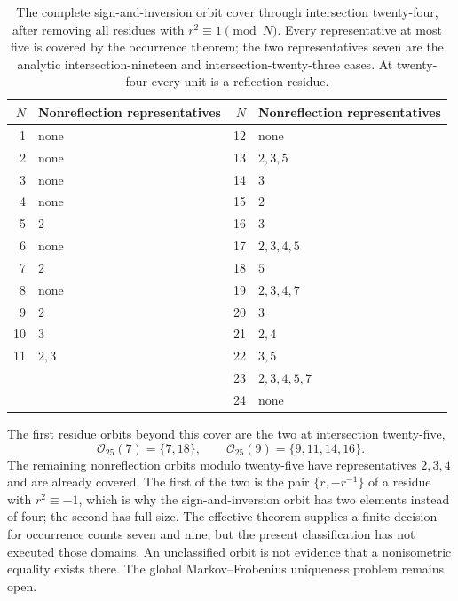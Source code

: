 \begin{table}[htbp]
\centering
\begin{tabular}{@{}rl@{\qquad}rl@{}}
\toprule
$N$ & Nonreflection representatives & $N$ & Nonreflection representatives\\
\midrule
1 & none & 12 & none\\
2 & none & 13 & $2,3,5$\\
3 & none & 14 & $3$\\
4 & none & 15 & $2$\\
5 & $2$ & 16 & $3$\\
6 & none & 17 & $2,3,4,5$\\
7 & $2$ & 18 & $5$\\
8 & none & 19 & $2,3,4,7$\\
9 & $2$ & 20 & $3$\\
10 & $3$ & 21 & $2,4$\\
11 & $2,3$ & 22 & $3,5$\\
 & & 23 & $2,3,4,5,7$\\
 & & 24 & none\\
\bottomrule
\end{tabular}
\caption{The complete sign-and-inversion orbit cover through intersection twenty-four, after removing all residues with $r^2\equiv1\pmod N$. Every representative at most five is covered by the occurrence theorem; the two representatives seven are the analytic intersection-nineteen and intersection-twenty-three cases. At twenty-four every unit is a reflection residue.}
\label{tab:small-intersection-cover}
\end{table}

The first residue orbits beyond this cover are the two at intersection twenty-five,
$$
 \mathcal O_{25}(7)=\{7,18\},\qquad
 \mathcal O_{25}(9)=\{9,11,14,16\}.
$$
The remaining nonreflection orbits modulo twenty-five have representatives $2,3,4$ and are already covered. The first of the two is the pair $\{r,-r^{-1}\}$ of a residue with $r^2\equiv-1$, which is why the sign-and-inversion orbit has two elements instead of four; the second has full size. The effective theorem supplies a finite decision for occurrence counts seven and nine, but the present classification has not executed those domains. An unclassified orbit is not evidence that a nonisometric equality exists there. The global Markov--Frobenius uniqueness problem remains open.

